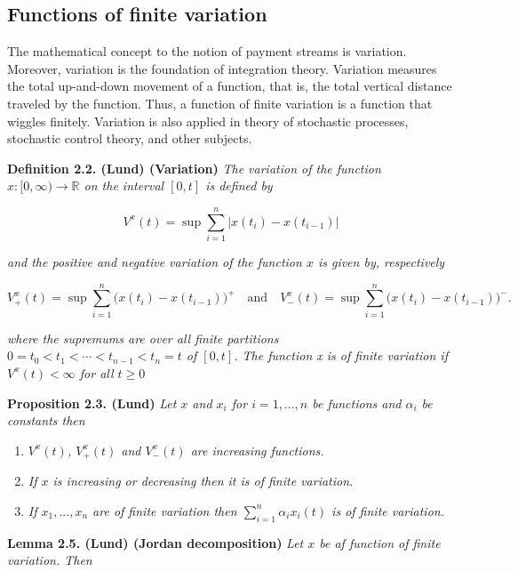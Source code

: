 \documentclass[a4paper,12pt,openany]{book}
\providecommand{\tightlist}{%
 \setlength{\itemsep}{0pt}\setlength{\parskip}{0pt}}
\begin{document}
\hypertarget{functions-of-finite-variation}{%
\subsection{Functions of finite variation}\label{functions-of-finite-variation}}

The mathematical concept to the notion of payment streams is variation. Moreover, variation is the foundation of integration theory. Variation measures the total up-and-down movement of a function, that is, the total vertical distance traveled by the function. Thus, a function of finite variation is a function that wiggles finitely. Variation is also applied in theory of stochastic processes, stochastic control theory, and other subjects.

\textbf{Definition 2.2. (Lund) (Variation)} \emph{The variation of the function \(x : [0, \infty) \to\mathbb R\) on the interval \([0, t]\) is defined by}

\[
V^x(t)=\sup\sum_{i=1}^n\vert x(t_i)-x(t_{i-1})\vert
\]

\emph{and the positive and negative variation of the function \(x\) is given by, respectively}

\[
V^x_+(t)=\sup\sum_{i=1}^n\big( x(t_i)-x(t_{i-1})\big)^+\quad \text{and}\quad V^x_-(t)=\sup\sum_{i=1}^n\big( x(t_i)-x(t_{i-1})\big)^-.
\]

\emph{where the supremums are over all finite partitions \(0 = t_0<t_1<\cdots<t_{n-1}<t_n=t\) of \([0,t]\). The function x is of finite variation if \(V^x(t)<\infty\) for all \(t\ge 0\)}

\textbf{Proposition 2.3. (Lund)} \emph{Let \(x\) and \(x_i\) for \(i=1,...,n\) be functions and \(\alpha_i\) be constants then}

\begin{enumerate}
\def\labelenumi{\roman{enumi})}
\tightlist
\item
  \emph{\(V^x(t)\), \(V^x_+(t)\) and \(V^x_-(t)\) are increasing functions.}
\item
  \emph{If \(x\) is increasing or decreasing then it is of finite variation.}
\item
  \emph{If \(x_1,...,x_n\) are of finite variation then \(\sum_{i=1}^n\alpha_ix_i(t)\) is of finite variation.}
\end{enumerate}

\textbf{Lemma 2.5. (Lund) (Jordan decomposition)} \emph{Let \(x\) be af function of finite variation. Then}
\end{document}
